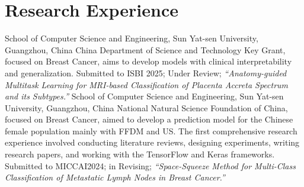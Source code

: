 \documentclass[11pt,a4paper, final]{moderncv}
\begin{document}
\section{\textbf{Research Experience}}%
	{}{}{School of Computer Science and Engineering, Sun Yat-sen University, Guangzhou, China}
	{China Department of Science and Technology Key Grant, focused on Breast Cancer, 
	aims to develop models with clinical interpretability and generalization.}
	{Submitted to ISBI 2025; Under Review; 
	\emph{“Anatomy-guided Multitask Learning for MRI-based Classification of Placenta Accreta Spectrum and its Subtypes.”}}
	{}{}{School of Computer Science and Engineering, Sun Yat-sen University, Guangzhou, China}
	{National Natural Science Foundation of China, focused on Breast Cancer, 
	aimed to develop a prediction model for the Chinese female population mainly with FFDM and US.}
	{The first comprehensive research experience involved conducting literature reviews, designing experiments, 
	writing research papers, and working with the TensorFlow and Keras frameworks.}
	{Submitted to MICCAI2024; in Revising; 
	\emph{“Space-Squeeze Method for Multi-Class Classification of Metastatic Lymph Nodes in Breast Cancer.”}}
\end{document}
